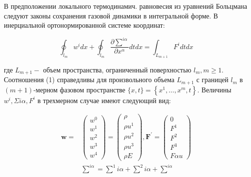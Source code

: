 \documentclass[10pt]{article}
\begin{document}
В предположении локального термодинамич. равновесия из уравнений Больцмана следуют законы сохранения газовой динамики в интегральной форме. В инерциальной ортонормированной системе координат:



\[

\oint_{l_{m}} w^{i} d x+\oint_{l_{m}} \frac{\partial \sum^{i \alpha}}{\partial x^{\alpha}} d t d x=\int_{L_{m+1}} F^{i} d t d x

\]



где $L_{m+1}-$ объем пространства, ограниченный поверхностью $l_{m}, m \geqslant 1$. Соотношения (1) справедливы для произвольного объема $L_{m+1}$ с границей $l_{m}$ в $(m+1)$-мерном фазовом пространстве $\{x, t\}=\left\{x^{1}, \ldots, x^{m}, t\right\}$. Величины $w^{i}, \Sigma i \alpha, F^{i}$ в трехмерном случае имеют следующий вид:



\[

\begin{aligned}

\boldsymbol{w}= & \left(\begin{array}{l}

w^{0} \\

w^{1} \\

w^{2} \\

w^{3} \\

w^{4}

\end{array}\right)=\left(\begin{array}{l}

\rho \\

\rho u^{1} \\

\rho u^{2} \\

\rho u^{3} \\

\rho E

\end{array}\right), \boldsymbol{F}^{\prime}=\left(\begin{array}{l}

0 \\

F^{1} \\

F^{2} \\

F^{3} \\

F \alpha u

\end{array}\right) \\

& \sum^{i \alpha}=\sum^{1} i \alpha+\sum^{2} i \alpha+\sum^{i \alpha}

\end{aligned}

\]
\end{document}
